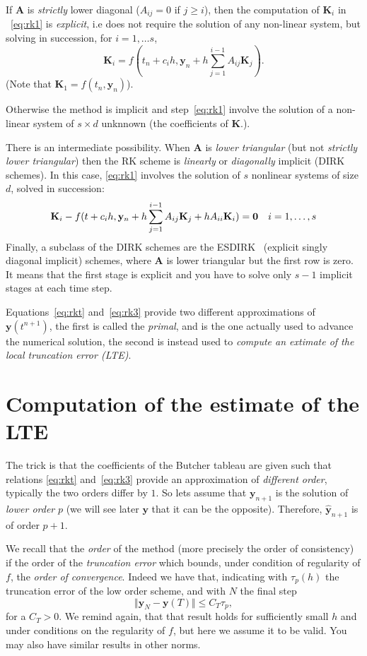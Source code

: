 \documentclass[10pt,a4paper,twoside]{article}
\begin{document}
If $\mathbf{A}$ is \emph{strictly} lower diagonal ($A_{ij}=0$ if $j\ge i$), then the  computation of $\mathbf{K}_i$ in ~\eqref{eq:rk1} is \emph{explicit}, i.e does not require the solution of any non-linear system, but solving in succession, for $i=1,\ldots s$,
\[
\mathbf{K}_i = f(t_n+c_ih,\mathbf{y}_n+h\sum_{j=1}^{i-1} A_{ij}\mathbf{K}_j).
\]
(Note that $\mathbf{K}_1=f(t_n,\mathbf{y}_n)$).

Otherwise the method is implicit and step~\eqref{eq:rk1} involve the solution of a non-linear system of $s\times d$ unknnown (the coefficients of $\mathbf{K}$.).

There is an intermediate possibility. When $\mathbf{A}$ is \emph{lower triangular} (but not \emph{strictly lower triangular}) then the RK scheme is \emph{linearly} or \emph{diagonally} implicit
(DIRK schemes). In this case, \eqref{eq:rk1} involves the solution of $s$ nonlinear systems of size $d$, solved in succession:
\[
\mathbf{K}_i - f(t+c_ih,\mathbf{y}_n+h\sum_{j=1}^{i-1} A_{ij}\mathbf{K}_j +hA_{ii}\mathbf{K}_i)=\mathbf{0}\quad i=1,\ldots,s\\\label{eq:rk2ex}
\]
Finally, a subclass of the DIRK schemes are the ESDIRK~\cite{jorgensenFamilyESDIRKIntegration2018} (explicit singly diagonal implicit) schemes, where $\mathbf{A}$ is lower triangular but the first row is zero. It means that the first stage is explicit and you have to solve only $s-1$ implicit stages at each time step. 
\smallskip

Equations~\eqref{eq:rkt} and~\eqref{eq:rk3} provide two different approximations of $\mathbf{y}(t^{n+1})$, the first is called the \emph{primal}, and is the one actually used to advance the numerical solution, the second is instead used to \emph{compute an extimate of the local truncation error (LTE)}.
\section{Computation of the estimate of the LTE}
The trick is that the coefficients of the Butcher tableau are given such that relations \eqref{eq:rkt} and~\eqref{eq:rk3} provide an approximation of \emph{different order}, typically the two orders differ by $1$. So lets assume that $\mathbf{y}_{n+1}$ is the solution of \emph{lower order} $p$ (we will see later $\mathbf{y}$ that it can be the opposite). Therefore, $\hat{\mathbf{y}}_{n+1}$ is of order $p+1$. 

We recall that the \emph{order} of the method (more precisely the order of consistency) if the order of the \emph{truncation error} which bounds, under condition of regularity of $f$, the \emph{order of convergence}. Indeed we have that, indicating with $\tau_p(h)$ the truncation error of the low order scheme, and with $N$ the final step
\begin{equation}\label{eq:converg}
\Vert \mathbf{y}_{N}-\mathbf{y}(T)\Vert \le C_T \tau_p,
\end{equation}
for a $C_T>0$.
We remind again, that that result holds for sufficiently small $h$ and under conditions on the regularity of $f$, but here we assume it to be valid. You may also have similar results in other norms.
\end{document}

